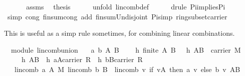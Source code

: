 \begin{isabellebody}
%
\isadelimproof
%
\endisadelimproof
%
\isatagproof
{}\isamarkupfalse%
\ {\isacharminus}\ \isanewline
\ \ \isamarkupfalse%
\ assms\ \isamarkupfalse%
\ {\isacharquery}thesis\isanewline
\ \ \ \ \isamarkupfalse%
\ {\isacharparenleft}unfold\ lincomb{\isacharunderscore}def{\isacharparenright}\isanewline
\ \ \ \ \isamarkupfalse%
\ {\isacharparenleft}drule\ Pi{\isacharunderscore}implies{\isacharunderscore}Pi{}{\isacharparenright}\isanewline
\ \ \ \ \isamarkupfalse%
\ {\isacharparenleft}simp\ cong{\isacharcolon}\ finsum{\isacharunderscore}cong{}\ add{\isacharcolon}\ finsum{\isacharunderscore}Un{\isacharunderscore}disjoint\ Pi{\isacharunderscore}simp\ ring{\isacharunderscore}subset{\isacharunderscore}carrier{\isacharparenright}\isanewline
{}\isamarkupfalse%
%
\endisatagproof
{\isafoldproof}%
%
\isadelimproof
%
\endisadelimproof
%
\begin{isamarkuptext}%
This is useful as a simp rule sometimes, for combining linear combinations.%
\end{isamarkuptext}%
\isamarkuptrue%
\isamarkupfalse%
\ {\isacharparenleft}\ module{\isacharparenright}\ lincomb{\isacharunderscore}union{}{\isacharcolon}\isanewline
\ \ \ a\ b\ A\ B\ \isanewline
\ \ \ h{}{\isacharcolon}\ {\isachardoublequoteopen}finite\ {\isacharparenleft}A{\isasymunion}\ B{\isacharparenright}{\isachardoublequoteclose}\ \ \ h{}{\isacharcolon}\ {\isachardoublequoteopen}A{\isasymunion}B\ {\isasymsubseteq}\ carrier\ M{\isachardoublequoteclose}\ \isanewline
\ \ \ \ \ h{}{\isacharcolon}\ {\isachardoublequoteopen}A{\isasyminter}B{\isacharequal}{\isacharbraceleft}{\isacharbraceright}{\isachardoublequoteclose}\ \ h{}{\isacharcolon}\ {\isachardoublequoteopen}a{\isasymin}A{\isasymrightarrow}carrier\ R{\isachardoublequoteclose}\ \ h{}{\isacharcolon}\ {\isachardoublequoteopen}b{\isasymin}B{\isasymrightarrow}carrier\ R{\isachardoublequoteclose}\isanewline
\ \ \ {\isachardoublequoteopen}lincomb\ a\ A\ {\isasymoplus}\isactrlbsub M\isactrlesub \ lincomb\ b\ B\ {\isacharequal}\ lincomb\ {\isacharparenleft}{\isasymlambda}v{\isachardot}\ if\ {\isacharparenleft}v{\isasymin}A{\isacharparenright}\ then\ a\ v\ else\ b\ v{\isacharparenright}\ {\isacharparenleft}A{\isasymunion}B{\isacharparenright}{\isachardoublequoteclose}\isanewline

\end{isabellebody}
